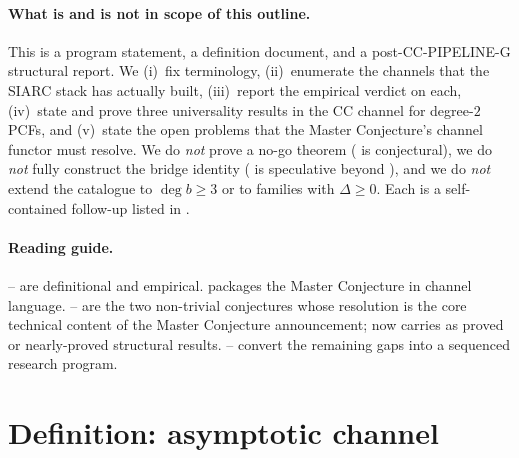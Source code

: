 \documentclass[11pt,reqno]{amsart}
\theoremstyle{plain}
\theoremstyle{definition}
\theoremstyle{remark}
\newcommand{\CC}{\mathrm{CC}}
\begin{document}
\paragraph{What is and is not in scope of this outline.}
This is a program statement, a definition document, and a
post-CC-PIPELINE-G structural report. We
(i)~fix terminology, (ii)~enumerate the channels that the
SIARC stack has actually built, (iii)~report the empirical
verdict on each, (iv)~state and prove three universality
results in the $\CC$ channel for degree-$2$ PCFs, and
(v)~state the open problems that the Master Conjecture's
channel functor must resolve. We do \emph{not} prove a no-go
theorem ( is conjectural), we do \emph{not}
fully construct the bridge identity
( is speculative beyond
), and we do \emph{not} extend the catalogue to
$\deg b \ge 3$ or to families with $\Delta \geq 0$. Each is a
self-contained follow-up listed in .

\paragraph{Reading guide.}
-- are definitional and
empirical.  packages the Master
Conjecture in channel language. --%
 are the two non-trivial conjectures whose
resolution is the core technical content of the Master
Conjecture announcement;  now carries
 as proved or
nearly-proved structural results.
-- convert the
remaining gaps into a sequenced research program.

\section{Definition: asymptotic channel}
\label{sec:def}
\end{document}
